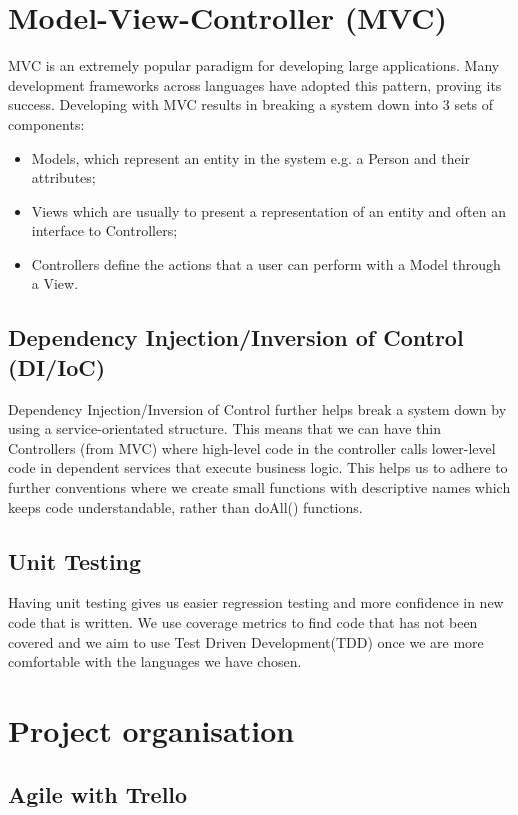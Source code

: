 \documentclass[11pt,a4paper]{report}
\begin{document}
\section{Model-View-Controller (MVC)}
MVC is an extremely popular paradigm for developing large applications. Many development frameworks across languages have adopted this pattern, proving its success. Developing with MVC results in breaking a system down into 3 sets of components:
\begin{itemize}
  \item Models, which represent an entity in the system e.g. a Person and their attributes;
  \item Views which are usually to present a representation of an entity and often an interface to Controllers;
  \item Controllers define the actions that a user can perform with a Model through a View.
\end{itemize}

\subsection{Dependency Injection/Inversion of Control (DI/IoC)}
Dependency Injection/Inversion of Control further helps break a system down by using a service-orientated structure.
This means that we can have thin Controllers (from MVC) where high-level code in the controller calls lower-level code in dependent services that execute business logic.
This helps us to adhere to further conventions where we create small functions with descriptive names which keeps code understandable, rather than doAll() functions.

\subsection{Unit Testing}

Having unit testing gives us easier regression testing and more confidence in new code that is written. We use coverage metrics to find code that has not been covered and we aim to use Test Driven Development(TDD) once we are more comfortable with the languages we have chosen.

\section{Project organisation}

\subsection{Agile with Trello}
\end{document}
